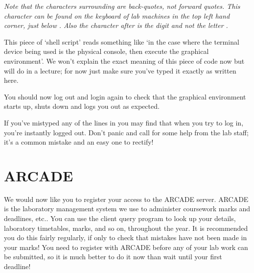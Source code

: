 \emph{Note that the characters surrounding  are back-quotes, not forward quotes. This character can be found on the keyboard of lab machines in the top left hand corner, just below . Also the character after  is the digit  and not the letter .}

This piece of `shell script' reads something like `in the case where the terminal device being used is the physical console, then execute the graphical environment'. We won't explain the exact meaning of this piece of code now but will do in a lecture; for now just make sure you've typed it exactly as written here.

You should now log out and login again to check that the graphical environment starts up, shuts down and logs you out as expected. 

If you've mistyped any of the lines in  you may find that when you try to log in, you're instantly logged out. Don't panic and call for some help from the lab staff; it's a common mistake and an easy one to rectify! 







\FloatBarrier

\section{ARCADE}

We would now like you to register your access to the ARCADE server. ARCADE is the laboratory management system we use to administer coursework marks and deadlines, etc.. You can use the client query program to look up your details, laboratory timetables, marks, and so on, throughout the year. It is recommended you do this fairly regularly, if only to check that mistakes have not been made in your marks! You need to register with ARCADE before any of your lab work can be submitted, so it is much better to do it now than wait until your first deadline!

